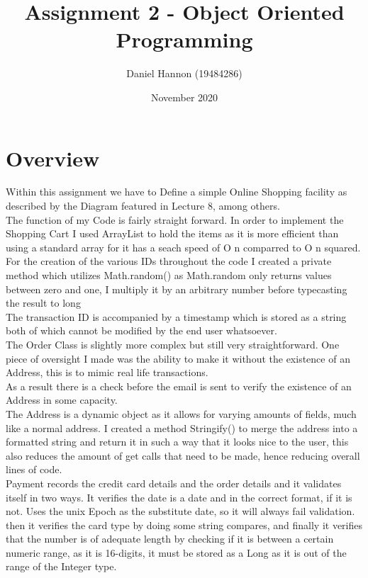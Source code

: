 \documentclass{article}
\title{Assignment 2 - Object Oriented Programming}
\author{Daniel Hannon (19484286)}
\date{November 2020}
\begin{document}
	\maketitle
	\section{Overview}

	Within this assignment we have to Define a simple Online Shopping facility as described by the Diagram featured in Lecture 8, among others.\\The function of my Code is fairly straight forward. In order to implement the Shopping Cart I used ArrayList to hold the items as it is more efficient than using a standard array for it has a seach speed of O n comparred to O n squared. \\ For the creation of the various IDs throughout the code I created a private method which utilizes Math.random() as Math.random only returns values between zero and one, I multiply it by an arbitrary number before typecasting the result to long\\ The transaction ID is accompanied by a timestamp which is stored as a string both of which cannot be modified by the end user whatsoever.\\ The Order Class is slightly more complex but still very straightforward. One piece of oversight I made was the ability to make it without the existence of an Address, this is to mimic real life transactions.\\ As a result there is a check before the email is sent to verify the existence of an Address in some capacity. \\ The Address is a dynamic object as it allows for varying amounts of fields, much like a normal address. I created a method Stringify() to merge the address into a formatted string and return it in such a way that it looks nice to the user, this also reduces the amount of get calls that need to be made, hence reducing overall lines of code.\\ Payment records the credit card details and the order details and it validates itself in two ways. It verifies the date is a date and in the correct format, if it is not. Uses the unix Epoch as the substitute date, so it will always fail validation. then it verifies the card type by doing some string compares, and finally it verifies that the number is of adequate length by checking if it is between a certain numeric range, as it is 16-digits, it must be stored as a Long as it is out of the range of the Integer type.
\end{document}

